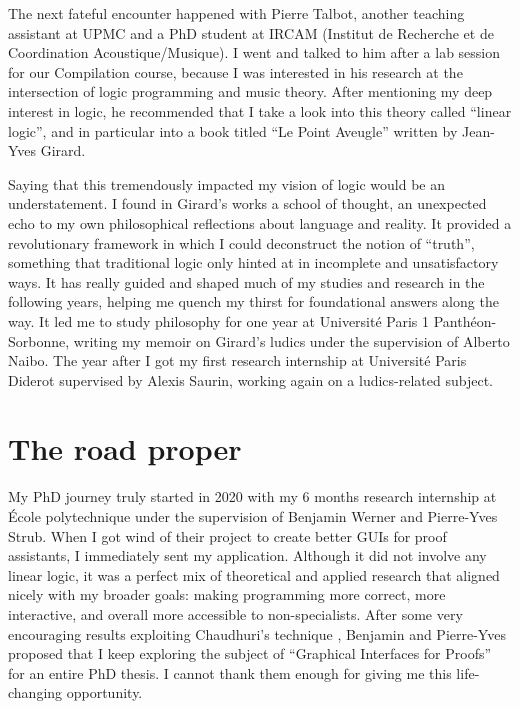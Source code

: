 The next fateful encounter happened with Pierre Talbot, another teaching assistant at UPMC and a PhD student at IRCAM (Institut de Recherche et de Coordination Acoustique/Musique). I went and talked to him after a lab session for our Compilation course, because I was interested in his research at the intersection of logic programming and music theory. After mentioning my deep interest in logic, he recommended that I take a look into this theory called ``linear logic'', and in particular into a book titled ``Le Point Aveugle'' written by Jean-Yves Girard.

Saying that this tremendously impacted my vision of logic would be an understatement. I found in Girard's works a school of thought, an unexpected echo to my own philosophical reflections about language and reality. It provided a revolutionary framework in which I could deconstruct the notion of ``truth'', something that traditional logic only hinted at in incomplete and unsatisfactory ways. It has really guided and shaped much of my studies and research in the following years, helping me quench my thirst for foundational answers along the way. It led me to study philosophy for one year at Université Paris 1 Panthéon-Sorbonne, writing my memoir on Girard's ludics under the supervision of Alberto Naibo. The year after I got my first research internship at Université Paris Diderot supervised by Alexis Saurin, working again on a ludics-related subject.

\section*{The road proper}

My PhD journey truly started in 2020 with my 6 months research internship at École polytechnique under the supervision of Benjamin Werner and Pierre-Yves Strub. When I got wind of their project to create better GUIs for proof assistants, I immediately sent my application. Although it did not involve any linear logic, it was a perfect mix of theoretical and applied research that aligned nicely with my broader goals: making programming more correct, more interactive, and overall more accessible to non-specialists. After some very encouraging results exploiting Chaudhuri's  technique \cite{Chaudhuri2013}, Benjamin and Pierre-Yves proposed that I keep exploring the subject of ``Graphical Interfaces for Proofs'' for an entire PhD thesis. I cannot thank them enough for giving me this life-changing opportunity.

